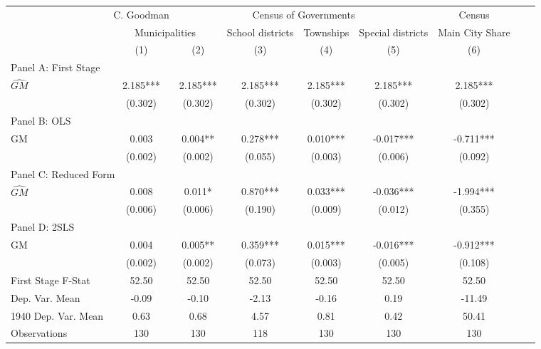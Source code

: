  \begin{tabular}{l*{8}{c}} \toprule
&\multicolumn{1}{c}{C. Goodman}&\multicolumn{4}{c}{Census of Governments}&\multicolumn{1}{c}{Census}\\\cmidrule(lr){2-2}\cmidrule(lr){3-6}\cmidrule(lr){7-7}
&\multicolumn{2}{c}{Municipalities}&\multicolumn{1}{c}{School districts}&\multicolumn{1}{c}{Townships}&\multicolumn{1}{c}{Special districts}&\multicolumn{1}{c}{Main City Share}\\\cmidrule(lr){2-3}\cmidrule(lr){4-6}\cmidrule(lr){7-7}
&\multicolumn{1}{c}{(1)}&\multicolumn{1}{c}{(2)}&\multicolumn{1}{c}{(3)}&\multicolumn{1}{c}{(4)}&\multicolumn{1}{c}{(5)}&\multicolumn{1}{c}{(6)}\\
\cmidrule(lr){1-7}
\multicolumn{6}{l}{Panel A: First Stage}\\
\cmidrule(lr){1-7}
$\widehat{GM}$  &    2.185***&    2.185***&    2.185***&    2.185***&    2.185***&    2.185***\\
                &  (0.302)   &  (0.302)   &  (0.302)   &  (0.302)   &  (0.302)   &  (0.302)   \\
\cmidrule(lr){1-7}
\multicolumn{6}{l}{Panel B: OLS}\\
\cmidrule(lr){1-7}
GM              &    0.003   &    0.004** &    0.278***&    0.010***&   -0.017***&   -0.711***\\
                &  (0.002)   &  (0.002)   &  (0.055)   &  (0.003)   &  (0.006)   &  (0.092)   \\
\cmidrule(lr){1-7}
\multicolumn{6}{l}{Panel C: Reduced Form}\\
\cmidrule(lr){1-7}
$\widehat{GM}$  &    0.008   &    0.011*  &    0.870***&    0.033***&   -0.036***&   -1.994***\\
                &  (0.006)   &  (0.006)   &  (0.190)   &  (0.009)   &  (0.012)   &  (0.355)   \\
\cmidrule(lr){1-7}
\multicolumn{6}{l}{Panel D: 2SLS}\\
\cmidrule(lr){1-7}
GM              &    0.004   &    0.005** &    0.359***&    0.015***&   -0.016***&   -0.912***\\
                &  (0.002)   &  (0.002)   &  (0.073)   &  (0.003)   &  (0.005)   &  (0.108)   \\
\midrule
First Stage F-Stat&    52.50   &    52.50   &    52.50   &    52.50   &    52.50   &    52.50   \\
Dep. Var. Mean  &    -0.09   &    -0.10   &    -2.13   &    -0.16   &     0.19   &   -11.49   \\
1940 Dep. Var. Mean&     0.63   &     0.68   &     4.57   &     0.81   &     0.42   &    50.41   \\
Observations    &      130   &      130   &      118   &      130   &      130   &      130   \\
 \bottomrule \end{tabular}
